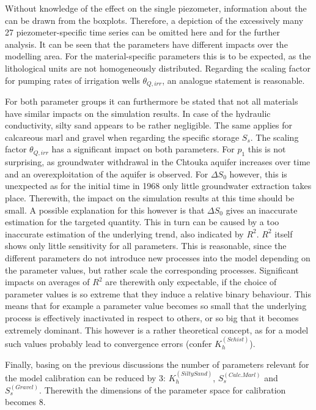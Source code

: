 Without knowledge of the effect on the single piezometer, information about the can be drawn from the boxplots. 
Therefore, a depiction of the excessively many 27 piezometer-specific time series can be omitted here and for the further analysis. 
It can be seen that the parameters have different impacts over the modelling area. 
For the material-specific parameters this is to be expected, as the lithological units are not homogeneously distributed. 
Regarding the scaling factor for pumping rates of irrigation wells $\theta_{Q,irr}$, an analogue statement is reasonable.

For both parameter groups it can furthermore be stated that not all materials have similar impacts on the simulation results. 
In case of the hydraulic conductivity, silty sand appears to be rather negligible. 
The same applies for calcareous marl and gravel when regarding the specific storage $S_s$. 
The scaling factor $\theta_{Q,irr}$ has a significant impact on both parameters. 
For $p_1$ this is not surprising, as groundwater withdrawal in the Chtouka aquifer increases over time and an overexploitation of the aquifer is observed. 
For $\Delta S_0$ however, this is unexpected as for the initial time in 1968 only little groundwater extraction takes place. 
Therewith, the impact on the simulation results at this time should be small. 
A possible explanation for this however is that $\Delta S_0$ gives an inaccurate estimation for the targeted quantity. 
This in turn can be caused by a too inaccurate estimation of the underlying trend, also indicated by $R^2$. 
$R^2$ itself shows only little sensitivity for all parameters. 
This is reasonable, since the different parameters do not introduce new processes into the model depending on the parameter values, but rather scale the corresponding processes. 
Significant impacts on averages of $R^2$ are therewith only expectable, if the choice of parameter values is so extreme that they induce a relative binary behaviour. 
This means that for example a parameter value becomes so small that the underlying process is effectively inactivated in respect to others, or so big that it becomes extremely dominant. 
This however is a rather theoretical concept, as for a model such values probably lead to convergence errors (confer $K_h^{(Schist)}$).

Finally, basing on the previous discussions the number of parameters relevant for the model calibration can be reduced by 3: $K_h^{(Silty Sand)}$, $S_s^{(Calc. Marl)}$ and $S_s^{(Gravel)}$. 
Therewith the dimensions of the parameter space for calibration becomes 8.

